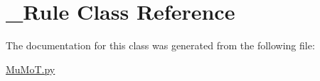 \hypertarget{class_mu_mo_t_1_1___rule}{}\section{\+\_\+\+Rule Class Reference}
\label{class_mu_mo_t_1_1___rule}


The documentation for this class was generated from the following file\+:\begin{DoxyCompactItemize}
\item 
\hyperlink{_mu_mo_t_8py}{Mu\+Mo\+T.\+py}\end{DoxyCompactItemize}
